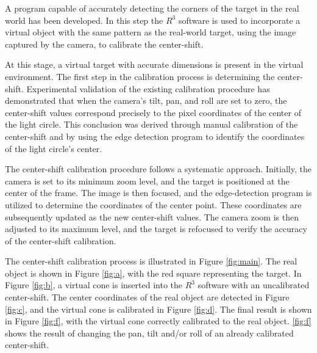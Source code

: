 \noindent A program capable of accurately detecting the corners of the target in the real world has been developed. In this step the \( R^3 \) software is used to incorporate a virtual object with the same pattern as the real-world target, using the image captured by the camera, to calibrate the center-shift.

\noindent At this stage, a virtual target with accurate dimensions is present in the virtual environment. The first step in the calibration process is determining the center-shift. Experimental validation of the existing calibration procedure has demonstrated that when the camera’s tilt, pan, and roll are set to zero, the center-shift values correspond precisely to the pixel coordinates of the center of the light circle. This conclusion was derived through manual calibration of the center-shift and by using the edge detection program to identify the coordinates of the light circle’s center.

\noindent The center-shift calibration procedure follows a systematic approach. Initially, the camera is set to its minimum zoom level, and the target is positioned at the center of the frame. The image is then focused, and the edge-detection program is utilized to determine the coordinates of the center point. These coordinates are subsequently updated as the new center-shift values. The camera zoom is then adjusted to its maximum level, and the target is refocused to verify the accuracy of the center-shift calibration.

\noindent The center-shift calibration process is illustrated in Figure \ref{fig:main}. The real object is shown in Figure \ref{fig:a}, with the red square representing the target. In Figure \ref{fig:b}, a virtual cone is inserted into the \( R^3 \) software with an uncalibrated center-shift. The center coordinates of the real object are detected in Figure \ref{fig:c}, and the virtual cone is calibrated in Figure \ref{fig:d}. The final result is shown in Figure \ref{fig:f}, with the virtual cone correctly calibrated to the real object. \ref{fig:f} shows the result of changing the pan, tilt and/or roll of an already calibrated center-shift.

